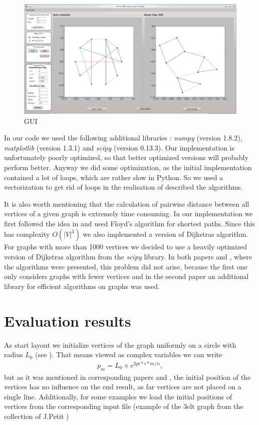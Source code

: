 \documentclass[12pt,a4paper]{article}
\begin{document}
\begin{figure}
	\centering
	\includegraphics[scale=0.4]{interface.png}
	\caption{GUI}\label{fig: interface}
\end{figure}

In our code we used the following additional libraries : {\it numpy} (version 1.8.2), {\it matplotlib} (version 1.3.1) and {\it scipy} (version 0.13.3). Our implementation is unfortunately poorly optimized, so that better optimized versions will probably perform better. Anyway we did some optimization, as the initial implementation contained a lot of loops, which are rather slow in Python. So we used a vectorization to get rid of loops in the realisation of described the algorithms.

It is also worth mentioning that the calculation of pairwise distance between all vertices of a given graph is extremely time consuming. In our implementation we first followed the idea in \cite{TomihisaKamada1989} and used Floyd's algorithm \cite{Floyd1962} for shortest paths. Since this has complexity $ O(|V|^3)$ we also implemented a version of Dijkstras algorithm. For graphs with more than 1000 vertices we decided to use a heavily optimized version of Dijkstras algorithm from the {\it scipy} library. In both papers \cite{TomihisaKamada1989} and \cite{DavidHarel2002}, where the algorithms were presented, this problem did not arise, because the first one only considers graphs with fewer vertices and in the second paper an additional library for efficient algorithms on graphs was used.

\section{Evaluation results}

As start layout we initialize vertices of the graph uniformly on a circle with radius $L_0$ (see \cite{TomihisaKamada1989}). That means viewed as complex variables we can write 
\begin{align*}
p_m =L_0 \times e^{2 pi*i*m /n},
\end{align*}
but as it was mentioned in corresponding papers \cite{TomihisaKamada1989} and \cite{DavidHarel2002}, the initial position of the vertices has no influence on the end result, as far vertices are not placed on a single line.
Additionally, for some examples we load the initial positions of vertices from the corresponding input file (example of the 3elt graph from the collection of J.Petit \cite{JordiPetit})\\
\end{document}
